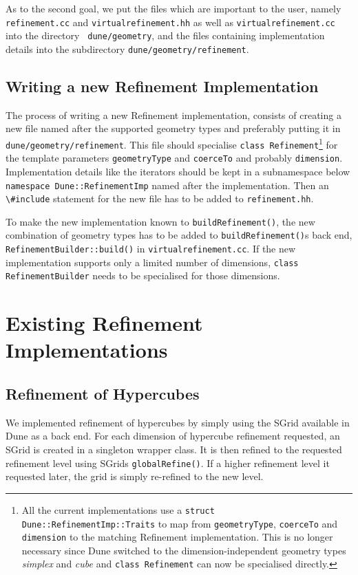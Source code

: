 \documentclass[english,a4paper]{article}
\newcommand{\code}[1]{\textnormal{\lstinline{#1}}}
\begin{document}
As to the second goal, we put the files which are important to the
user, namely {\tt refinement.cc} and {\tt virtualrefinement.hh} as
well as {\tt virtual\-re\-fine\-ment.cc} into the directory {\tt
  dune/geometry}, and the files containing implementation details
into the subdirectory {\tt dune/geometry/refinement}.

\subsection{Writing a new Refinement Implementation}

The process of writing a new Refinement implementation, consists of
creating a new file named after the supported geometry types and
preferably putting it in {\tt dune/geometry/refinement}.  This file
should specialise \code{class Refinement}\footnote{All the current
  implementations use a \code{struct Dune::RefinementImp::Traits} to
  map from \code{geometryType}, \code{coerceTo} and \code{dimension}
  to the matching Refinement implementation.  This is no longer
  necessary since Dune switched to the dimension-independent geometry
  types \emph{simplex} and \emph{cube} and \code{class Refinement} can now
  be specialised directly.} for the template parameters
\code{geometryType} and \code{coerceTo} and probably \code{dimension}.
Implementation details like the iterators should be kept in a
subnamespace below \code{namespace Dune::RefinementImp} named after
the implementation.  Then an \code{\#include} statement for the new
file has to be added to {\tt refinement.hh}.

To make the new implementation known to \code{buildRefinement()}, the
new combination of geometry types has to be added to
\code{buildRefinement()}s back end, \code{RefinementBuilder::build()}
in {\tt virtualrefinement.cc}.  If the new implementation supports
only a limited number of dimensions, \code{class RefinementBuilder}
needs to be specialised for those dimensions.

\section{Existing Refinement Implementations}

\subsection{Refinement of Hypercubes}

We implemented refinement of hypercubes by simply using the SGrid
available in Dune as a back end.  For each dimension of hypercube
refinement requested, an SGrid is created in a singleton wrapper
class.  It is then refined to the requested refinement level using
SGrids \code{globalRefine()}.  If a higher refinement level it
requested later, the grid is simply re-refined to the new level.
\end{document}
